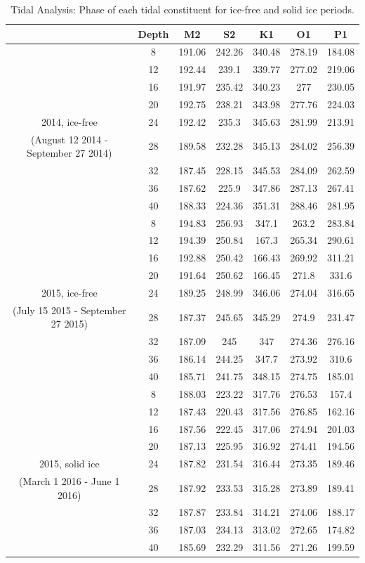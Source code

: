 \documentclass[12pt]{dforeport}
\begin{document}
\begin{table}[ht]
\centering
\caption[Phase of Tidal Constituents]{Tidal Analysis: Phase of each tidal constituent for ice-free and solid ice periods.} 
\label{t:phs}
\begin{tabular}{| c | c | c c c c c |}
\hline
& Depth & M2 & S2 & K1 & O1 & P1 \\
\hline
& 8 & 191.06 & 242.26 & 340.48 & 278.19 & 184.08 \\
& 12 & 192.44 & 239.1 & 339.77 & 277.02 & 219.06 \\
& 16 & 191.97 & 235.42 & 340.23 & 277 & 230.05 \\
& 20 & 192.75 & 238.21 & 343.98 & 277.76 & 224.03 \\
2014, ice-free & 24 & 192.42 & 235.3 & 345.63 & 281.99 & 213.91 \\
(August 12 2014 - September 27 2014)& 28 & 189.58 & 232.28 & 345.13 & 284.02 & 256.39 \\
& 32 & 187.45 & 228.15 & 345.53 & 284.09 & 262.59 \\
& 36 & 187.62 & 225.9 & 347.86 & 287.13 & 267.41 \\
& 40 & 188.33 & 224.36 & 351.31 & 288.46 & 281.95 \\
 \hline
& 8 & 194.83 & 256.93 & 347.1 & 263.2 & 283.84 \\
& 12 & 194.39 & 250.84 & 167.3 & 265.34 & 290.61 \\
& 16 & 192.88 & 250.42 & 166.43 & 269.92 & 311.21 \\
& 20 & 191.64 & 250.62 & 166.45 & 271.8 & 331.6 \\
2015, ice-free & 24 & 189.25 & 248.99 & 346.06 & 274.04 & 316.65 \\
(July 15 2015 - September 27 2015) & 28 & 187.37 & 245.65 & 345.29 & 274.9 & 231.47 \\
& 32 & 187.09 & 245 & 347 & 274.36 & 276.16 \\
& 36 & 186.14 & 244.25 & 347.7 & 273.92 & 310.6 \\
& 40 & 185.71 & 241.75 & 348.15 & 274.75 & 185.01 \\
 \hline
& 8 & 188.03 & 223.22 & 317.76 & 276.53 & 157.4 \\
& 12 & 187.43 & 220.43 & 317.56 & 276.85 & 162.16 \\
& 16 & 187.56 & 222.45 & 317.06 & 274.94 & 201.03 \\
& 20 & 187.13 & 225.95 & 316.92 & 274.41 & 194.56 \\
2015, solid ice & 24 & 187.82 & 231.54 & 316.44 & 273.35 & 189.46 \\
(March 1 2016 - June 1 2016) & 28 & 187.92 & 233.53 & 315.28 & 273.89 & 189.41 \\
& 32 & 187.87 & 233.84 & 314.21 & 274.06 & 188.17 \\
& 36 & 187.03 & 234.13 & 313.02 & 272.65 & 174.82 \\
& 40 & 185.69 & 232.29 & 311.56 & 271.26 & 199.59 \\
 \hline
\end{tabular}
\end{table}
\end{document}
